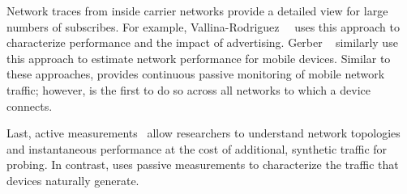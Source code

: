 Network traces from inside carrier networks provide a detailed view for large numbers 
of subscribes. For example, Vallina-Rodriguez~\etal~\cite{vallina-rod:ads} uses this approach to characterize performance and 
the impact of advertising. Gerber \etal~\cite{gerber:passivespeed} similarly use this approach to 
estimate network performance for mobile devices.  \cite{maier:mobtraffic} \cite{chen:wifi}
Similar to these approaches, \platname provides continuous passive monitoring of mobile network 
traffic; however, \platname is the first to do so across all networks to which a device connects.

Last, active measurements~\cite{wang:middleboxes,sommers:cellwifi} allow researchers to understand network topologies and instantaneous 
performance at the cost of additional, synthetic traffic for probing. In contrast, \platname uses 
passive measurements to characterize the traffic that devices
naturally generate.

